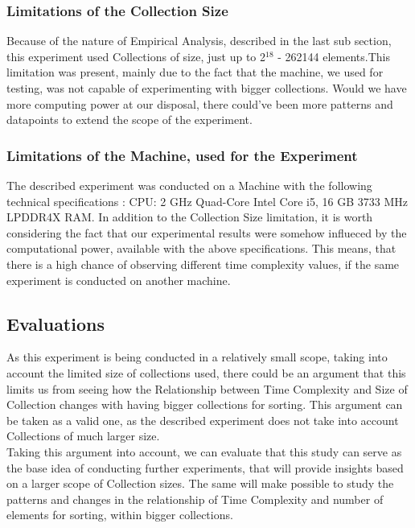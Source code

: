 \documentclass[]{report}
\begin{document}
\subsubsection{Limitations of the Collection Size}
Because of the nature of Empirical Analysis, described in the last sub section, this experiment used Collections of size, just up to 2$^{18}$ - 262144 elements.This limitation was present, mainly due to the fact that the machine, we used for testing, was not capable of experimenting with bigger collections. Would we have more computing power at our disposal, there could've been more patterns and datapoints to extend the scope of the experiment.
\subsubsection{Limitations of the Machine, used for the Experiment}
The described experiment was conducted on a Machine with the following technical specifications : CPU: 2 GHz Quad-Core Intel Core i5, 16 GB 3733 MHz LPDDR4X RAM. In addition to the Collection Size limitation, it is worth considering the fact that our experimental results were somehow influeced by the computational power, available with the above specifications. This means, that there is a high chance of observing different time complexity values, if the same experiment is conducted on another machine.
\subsection{Evaluations}
	As this experiment is being conducted in a relatively small scope, taking into account the limited size of collections used, there could be an argument that this limits us from seeing how the Relationship between Time Complexity and Size of Collection changes with having bigger collections for sorting. This argument can be taken as a valid one, as the described experiment does not take into account Collections of much larger size. \\
	
	Taking this argument into account, we can evaluate that this study can serve as the base idea of conducting further experiments, that will provide insights based on a larger scope of Collection sizes. The same will make possible to study the patterns and changes in the relationship of Time Complexity and number of elements for sorting, within bigger collections.
 
\end{document}
